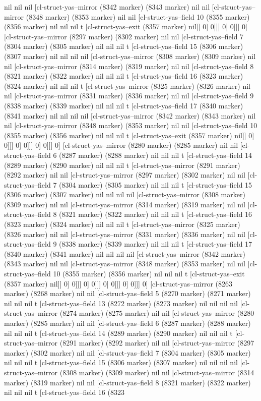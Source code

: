 {{nil nil nil [cl-struct-yas--mirror (8342 marker) (8343 marker) nil nil [cl-struct-yas--mirror (8348 marker) (8353 marker) nil nil [cl-struct-yas--field 10 (8355 marker) (8356 marker) nil nil nil t [cl-struct-yas--exit (8357 marker) nil]] 0] 0]]] 0] 0]]] 0] [cl-struct-yas--mirror (8297 marker) (8302 marker) nil nil [cl-struct-yas--field 7 (8304 marker) (8305 marker) nil nil nil t [cl-struct-yas--field 15 (8306 marker) (8307 marker) nil nil nil nil [cl-struct-yas--mirror (8308 marker) (8309 marker) nil nil [cl-struct-yas--mirror (8314 marker) (8319 marker) nil nil [cl-struct-yas--field 8 (8321 marker) (8322 marker) nil nil nil t [cl-struct-yas--field 16 (8323 marker) (8324 marker) nil nil nil t [cl-struct-yas--mirror (8325 marker) (8326 marker) nil nil [cl-struct-yas--mirror (8331 marker) (8336 marker) nil nil [cl-struct-yas--field 9 (8338 marker) (8339 marker) nil nil nil t [cl-struct-yas--field 17 (8340 marker) (8341 marker) nil nil nil nil [cl-struct-yas--mirror (8342 marker) (8343 marker) nil nil [cl-struct-yas--mirror (8348 marker) (8353 marker) nil nil [cl-struct-yas--field 10 (8355 marker) (8356 marker) nil nil nil t [cl-struct-yas--exit (8357 marker) nil]] 0] 0]]] 0] 0]]] 0] 0]]] 0] [cl-struct-yas--mirror (8280 marker) (8285 marker) nil nil [cl-struct-yas--field 6 (8287 marker) (8288 marker) nil nil nil t [cl-struct-yas--field 14 (8289 marker) (8290 marker) nil nil nil t [cl-struct-yas--mirror (8291 marker) (8292 marker) nil nil [cl-struct-yas--mirror (8297 marker) (8302 marker) nil nil [cl-struct-yas--field 7 (8304 marker) (8305 marker) nil nil nil t [cl-struct-yas--field 15 (8306 marker) (8307 marker) nil nil nil nil [cl-struct-yas--mirror (8308 marker) (8309 marker) nil nil [cl-struct-yas--mirror (8314 marker) (8319 marker) nil nil [cl-struct-yas--field 8 (8321 marker) (8322 marker) nil nil nil t [cl-struct-yas--field 16 (8323 marker) (8324 marker) nil nil nil t [cl-struct-yas--mirror (8325 marker) (8326 marker) nil nil [cl-struct-yas--mirror (8331 marker) (8336 marker) nil nil [cl-struct-yas--field 9 (8338 marker) (8339 marker) nil nil nil t [cl-struct-yas--field 17 (8340 marker) (8341 marker) nil nil nil nil [cl-struct-yas--mirror (8342 marker) (8343 marker) nil nil [cl-struct-yas--mirror (8348 marker) (8353 marker) nil nil [cl-struct-yas--field 10 (8355 marker) (8356 marker) nil nil nil t [cl-struct-yas--exit (8357 marker) nil]] 0] 0]]] 0] 0]]] 0] 0]]] 0] 0]]] 0] [cl-struct-yas--mirror (8263 marker) (8268 marker) nil nil [cl-struct-yas--field 5 (8270 marker) (8271 marker) nil nil nil t [cl-struct-yas--field 13 (8272 marker) (8273 marker) nil nil nil nil [cl-struct-yas--mirror (8274 marker) (8275 marker) nil nil [cl-struct-yas--mirror (8280 marker) (8285 marker) nil nil [cl-struct-yas--field 6 (8287 marker) (8288 marker) nil nil nil t [cl-struct-yas--field 14 (8289 marker) (8290 marker) nil nil nil t [cl-struct-yas--mirror (8291 marker) (8292 marker) nil nil [cl-struct-yas--mirror (8297 marker) (8302 marker) nil nil [cl-struct-yas--field 7 (8304 marker) (8305 marker) nil nil nil t [cl-struct-yas--field 15 (8306 marker) (8307 marker) nil nil nil nil [cl-struct-yas--mirror (8308 marker) (8309 marker) nil nil [cl-struct-yas--mirror (8314 marker) (8319 marker) nil nil [cl-struct-yas--field 8 (8321 marker) (8322 marker) nil nil nil t [cl-struct-yas--field 16 (8323 }}
